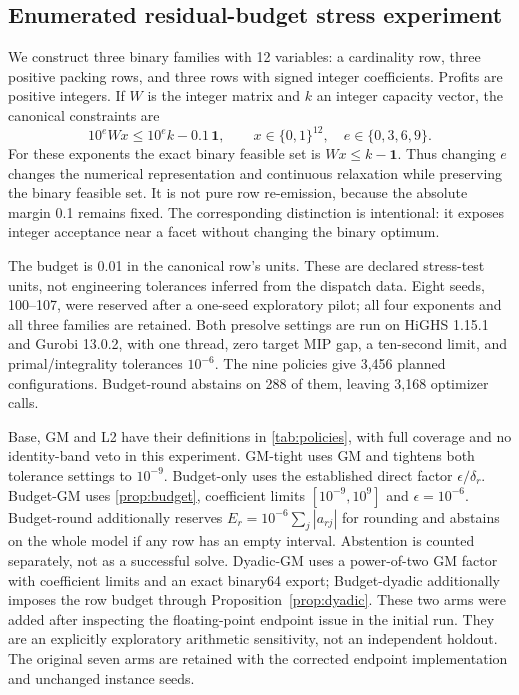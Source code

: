 \documentclass[11pt]{article}
\theoremstyle{definition}
\theoremstyle{remark}
\begin{document}
\subsection{Enumerated residual-budget stress experiment}
We construct three binary families with 12 variables: a cardinality row, three positive
packing rows, and three rows with signed integer coefficients. Profits are positive
integers. If $W$ is the integer matrix and $k$ an integer capacity vector, the canonical
constraints are
\begin{equation}\label{eq:stress-family}
 10^e Wx\le 10^e k-0.1\,\boldsymbol 1,\qquad x\in\{0,1\}^{12},
 \quad e\in\{0,3,6,9\}.
\end{equation}
For these exponents the exact binary feasible set is $Wx\le k-\boldsymbol 1$.
Thus changing $e$ changes the numerical representation and continuous relaxation while
preserving the binary feasible set. It is not pure row re-emission, because the absolute
margin 0.1 remains fixed. The corresponding distinction is intentional: it exposes
integer acceptance near a facet without changing the binary optimum.

The budget is 0.01 in the canonical row's units. These are declared stress-test units,
not engineering tolerances inferred from the dispatch data. Eight seeds, 100--107, were
reserved after a one-seed exploratory pilot; all four exponents and all three families
are retained. Both presolve settings are run on HiGHS 1.15.1 and Gurobi 13.0.2, with one
thread, zero target MIP gap, a ten-second limit, and primal/integrality tolerances
$10^{-6}$. The nine policies give 3,456 planned configurations. Budget-round abstains
on 288 of them, leaving 3,168 optimizer calls.

Base, GM and L2 have their definitions in \cref{tab:policies}, with full coverage and no
identity-band veto in this experiment. GM-tight uses GM and tightens both tolerance
settings to $10^{-9}$. Budget-only uses the established direct factor
$\epsilon/\delta_r$. Budget-GM uses \cref{prop:budget}, coefficient limits
$[10^{-9},10^9]$ and $\epsilon=10^{-6}$. Budget-round additionally reserves
$E_r=10^{-6}\sum_j|a_{rj}|$ for rounding and abstains on the whole model if any row has
an empty interval. Abstention is counted separately, not as a successful solve.
Dyadic-GM uses a power-of-two GM factor with coefficient limits and an exact
binary64 export; Budget-dyadic additionally imposes the row budget through
Proposition~\ref{prop:dyadic}. These two arms were added after inspecting the
floating-point endpoint issue in the initial run. They are an explicitly exploratory
arithmetic sensitivity, not an independent holdout. The original seven arms are retained
with the corrected endpoint implementation and unchanged instance seeds.
\end{document}
